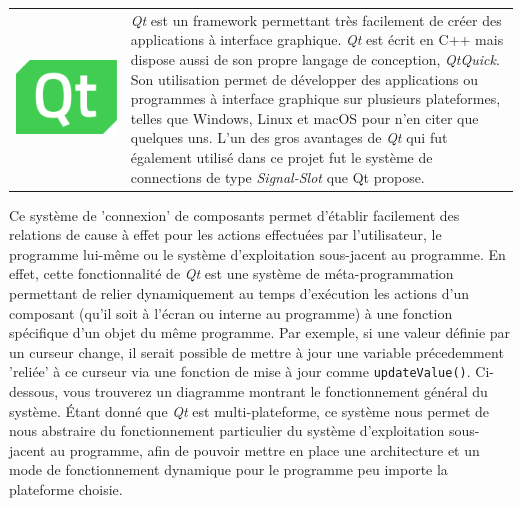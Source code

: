 \begin{tabular}{C{.2\textwidth} L{.71\textwidth}}
    \includegraphics[width=\linewidth]{img/logos/qt.png}\captionsetup{width=\linewidth}\label{img:qt:logo} & \textit{Qt} est un framework permettant très facilement de créer des applications à interface graphique. \textit{Qt} est écrit en C++ mais dispose aussi de son propre langage de conception, \textit{QtQuick}. Son utilisation permet de développer des applications ou programmes à interface graphique sur plusieurs plateformes, telles que Windows, Linux et macOS pour n'en citer que quelques uns. L'un des gros avantages de \textit{Qt} qui fut également utilisé dans ce projet fut le système de connections de type \textit{Signal-Slot} que Qt propose.
\end{tabular}

Ce système de 'connexion' de composants permet d'établir facilement des relations de cause à effet pour les actions effectuées par l'utilisateur, le programme lui-même ou le système d'exploitation sous-jacent au programme. En effet, cette fonctionnalité de \textit{Qt} est une système de méta-programmation permettant de relier dynamiquement au temps d'exécution les actions d'un composant (qu'il soit à l'écran ou interne au programme) à une fonction spécifique d'un objet du même programme. Par exemple, si une valeur définie par un curseur change, il serait possible de mettre à jour une variable précedemment 'reliée' à ce curseur via une fonction de mise à jour comme \texttt{updateValue()}. Ci-dessous, vous trouverez un diagramme montrant le fonctionnement général du système. Étant donné que \textit{Qt} est multi-plateforme, ce système nous permet de nous abstraire du fonctionnement particulier du système d'exploitation sous-jacent au programme, afin de pouvoir mettre en place une architecture et un mode de fonctionnement dynamique pour le programme peu importe la plateforme choisie.

